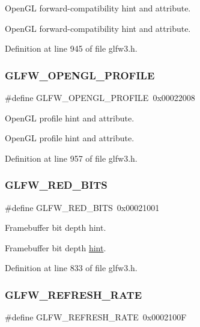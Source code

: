 Open\+GL forward-\/compatibility hint and attribute. 

Open\+GL forward-\/compatibility hint and attribute. 

Definition at line 945 of file glfw3.\+h.

\mbox{\label{group__window_ga44f3a6b4261fbe351e0b950b0f372e12}} 
\subsubsection{\texorpdfstring{GLFW\_OPENGL\_PROFILE}{GLFW\_OPENGL\_PROFILE}}
{\footnotesize\ttfamily \#define G\+L\+F\+W\+\_\+\+O\+P\+E\+N\+G\+L\+\_\+\+P\+R\+O\+F\+I\+LE~0x00022008}



Open\+GL profile hint and attribute. 

Open\+GL profile hint and attribute. 

Definition at line 957 of file glfw3.\+h.

\mbox{\label{group__window_gaf78ed8e417dbcc1e354906cc2708c982}} 
\subsubsection{\texorpdfstring{GLFW\_RED\_BITS}{GLFW\_RED\_BITS}}
{\footnotesize\ttfamily \#define G\+L\+F\+W\+\_\+\+R\+E\+D\+\_\+\+B\+I\+TS~0x00021001}



Framebuffer bit depth hint. 

Framebuffer bit depth \mbox{\hyperlink{group__window_gaf78ed8e417dbcc1e354906cc2708c982}{hint}}. 

Definition at line 833 of file glfw3.\+h.

\mbox{\label{group__window_ga0f20825e6e47ee8ba389024519682212}} 
\subsubsection{\texorpdfstring{GLFW\_REFRESH\_RATE}{GLFW\_REFRESH\_RATE}}
{\footnotesize\ttfamily \#define G\+L\+F\+W\+\_\+\+R\+E\+F\+R\+E\+S\+H\+\_\+\+R\+A\+TE~0x0002100F}



